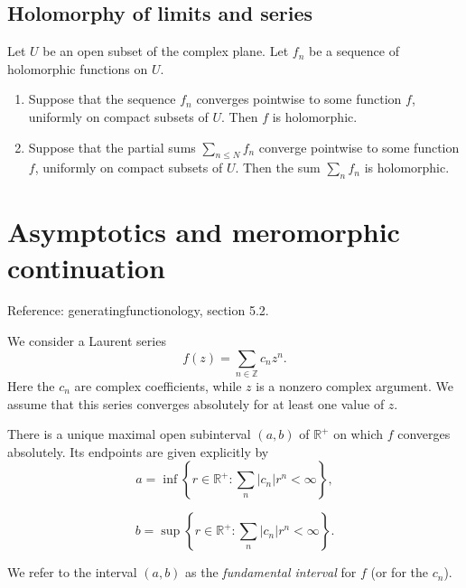 \documentclass[reqno]{amsart}  \numberwithin{theorem}{section} \numberwithin{equation}{section}
\begin{document}
\subsection{Holomorphy of limits and series}
\begin{theorem}\label{theorem:cj3vqa91ti}
  Let $U$ be an open subset of the complex plane.  Let $f_n$ be a sequence of holomorphic functions on $U$.
  \begin{enumerate}
  \item Suppose that the sequence $f_n$ converges pointwise to some function $f$, uniformly on compact subsets of $U$.  Then $f$ is holomorphic.
  \item Suppose that the partial sums $\sum_{n \leq N} f_n$ converge pointwise to some function $f$, uniformly on compact subsets of $U$.  Then the sum $\sum_n f_n$ is holomorphic.
  \end{enumerate}
\end{theorem}

\newpage
\section{Asymptotics and meromorphic continuation}

Reference: generatingfunctionology, section 5.2.


We consider a Laurent series
\begin{equation*}
f (z) = \sum_{n \in \mathbb{Z} } c_n z^n.
\end{equation*}
Here the $c_n$ are complex coefficients, while $z$ is a nonzero complex argument.  We assume that this series converges absolutely for at least one value of $z$.

\begin{lemma}\label{lemma:cj3vqafpa6}
  There is a unique maximal open subinterval $(a,b)$ of $\mathbb{R}^+$ on which $f$ converges absolutely.  Its endpoints are given explicitly by
  \begin{equation*}
a = \inf \left\{ r \in \mathbb{R}^+ : \sum_n \lvert c_n \rvert r^n < \infty  \right\},
\end{equation*}

\begin{equation*}
 b = \sup \left\{ r \in \mathbb{R}^+ : \sum_n \lvert c_n \rvert r^n < \infty  \right\}.
\end{equation*}
\end{lemma}
We refer to the interval $(a,b)$ as the \emph{fundamental interval} for $f$ (or for the $c_n$).
\end{document}
